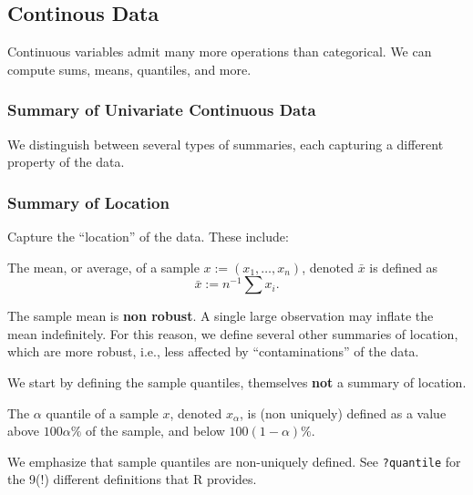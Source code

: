 \documentclass[]{book}
\theoremstyle{definition}
\theoremstyle{definition}
\theoremstyle{definition}
\theoremstyle{remark}
\let\BeginKnitrBlock\begin \let\EndKnitrBlock\end
\begin{document}
\hypertarget{continous-data}{%
\subsection{Continous Data}\label{continous-data}}

Continuous variables admit many more operations than categorical.
We can compute sums, means, quantiles, and more.

\hypertarget{summary-of-univariate-continuous-data}{%
\subsubsection{Summary of Univariate Continuous Data}\label{summary-of-univariate-continuous-data}}

We distinguish between several types of summaries, each capturing a different property of the data.

\hypertarget{summary-of-location}{%
\subsubsection{Summary of Location}\label{summary-of-location}}

Capture the ``location'' of the data. These include:

\BeginKnitrBlock{definition}[Average]
\protect\hypertarget{def:unnamed-chunk-113}{}{\label{def:unnamed-chunk-113} {} }The mean, or average, of a sample \(x:=(x_1,\dots,x_n)\), denoted \(\bar x\) is defined as
\[ \bar x := n^{-1} \sum x_i. \]
\EndKnitrBlock{definition}

The sample mean is \textbf{non robust}.
A single large observation may inflate the mean indefinitely.
For this reason, we define several other summaries of location, which are more robust, i.e., less affected by ``contaminations'' of the data.

We start by defining the sample quantiles, themselves \textbf{not} a summary of location.

\BeginKnitrBlock{definition}[Quantiles]
\protect\hypertarget{def:unnamed-chunk-114}{}{\label{def:unnamed-chunk-114} {} }The \(\alpha\) quantile of a sample \(x\), denoted \(x_\alpha\), is (non uniquely) defined as a value above \(100 \alpha \%\) of the sample, and below \(100 (1-\alpha) \%\).
\EndKnitrBlock{definition}

We emphasize that sample quantiles are non-uniquely defined. See \texttt{?quantile} for the 9(!) different definitions that R provides.
\end{document}
